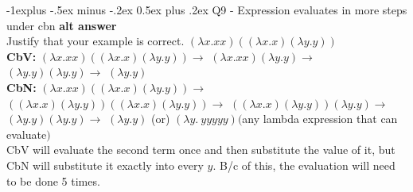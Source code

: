 \documentclass[letterpaper, 8pt]{extarticle}
\makeatletter
\renewcommand{\subsection}{\@startsection{subsection}{2}{0mm}%
                                {-1explus -.5ex minus -.2ex}%
                                {0.5ex plus .2ex}%
                                {\normalfont\small\bfseries}}
\makeatother
\begin{document}
\begin{multicols*}{4}
    \subsection{Q9 - Expression evaluates in more steps under cbn}
    \textbf{alt answer} \\
    Justify that your example is correct.
    $(\lambda x . x x ) (( \lambda x . x) (\lambda y.y))$\\
    \textbf{CbV:}
    $(\lambda x . x x) (( \lambda x .x ) (\lambda y .y )) \to$
    $(\lambda x . xx) (\lambda y .y )\to$
    $(\lambda y .y ) (\lambda y .y ) \to$
    $(\lambda y . y)$\\
    \textbf{CbN:}
    $(\lambda x . xx) (( \lambda x . x) (\lambda y . y))\to$
    $((\lambda x . x) (\lambda y. y)) ((\lambda x .x) (\lambda y .y))\to$
    $((\lambda x . x) ( \lambda y .y)) (\lambda y.y)\to$
    $(\lambda y .y)(\lambda y .y)\to$
    $(\lambda y .y)$
    (or)
    $(\lambda y.\ y y y y y)($any lambda expression that can evaluate$)$ \\
    CbV will evaluate the second term once and then substitute the value of it, but CbN will substitute it exactly into every $y$. B/c of this, the evaluation will need to be done 5 times.


\end{multicols*}
\end{document}
